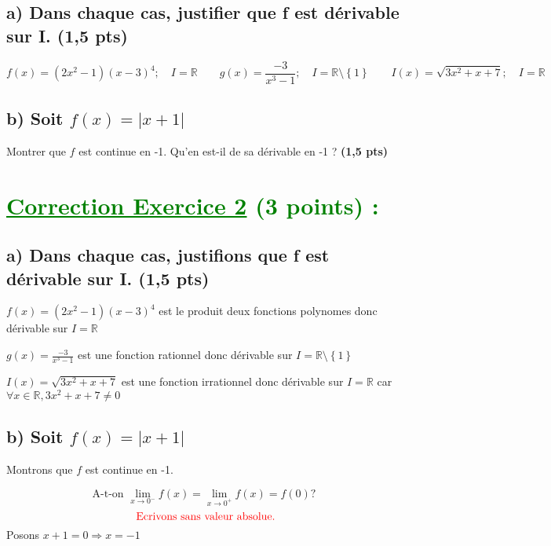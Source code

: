 \documentclass{article}
\begin{document}
\subsection*{a) Dans chaque cas, justifier que f est dérivable sur I. (1,5 pts)}
\[f(x)=(2x^{2}-1)(x-3)^{4};\quad I=\mathbb{R}\quad\quad g(x)=\frac{-3}{x^{3}-1};\quad I=\mathbb{R}\setminus\left\lbrace 1 \right\rbrace \quad\quad I(x)=\sqrt{3x^{2}+x+7};\quad I=\mathbb{R}\]
\subsection*{b) Soit $f(x)=|x+1|$ }
Montrer que $f$ est continue en -1. Qu'en est-il de sa dérivable en -1 ? \textbf{(1,5 pts)}
\section*{\textcolor{green}{\underline{Correction Exercice 2} (3 points) :}}
\subsection*{a) Dans chaque cas, justifions que f est dérivable sur I. (1,5 pts)}
$f(x)=(2x^{2}-1)(x-3)^{4}$ est le produit deux fonctions polynomes donc dérivable sur $I=\mathbb{R}$

$g(x)=\frac{-3}{x^{3}-1}$ est une fonction rationnel donc dérivable sur $I=\mathbb{R}\setminus\left\lbrace 1 \right\rbrace$

$I(x)=\sqrt{3x^{2}+x+7}$ est une fonction irrationnel donc dérivable sur $I=\mathbb{R}$ car\\ $\forall x\in \mathbb{R}, 3x^{2}+x+7\neq 0$
\subsection*{b) Soit $f(x)=|x+1|$ }
Montrons que $f$ est continue en -1.

\[\text{A-t-on }\lim_{x \to 0^{-}}f(x)=\lim_{x \to 0^{+}}f(x)=f(0)?\]
\[\textcolor{red}{\text{ Ecrivons sans valeur absolue.}}\]
Posons $x+1=0\Rightarrow x=-1$
\end{document}
